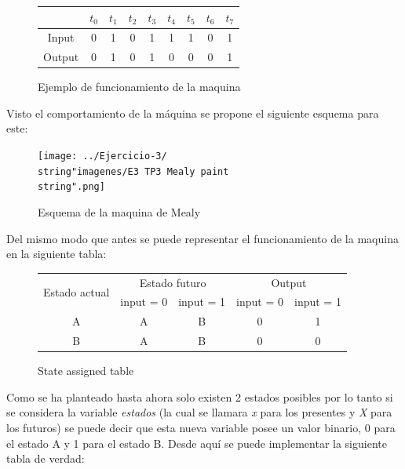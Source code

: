 \begin{figure}[H]
\begin{centering}
\begin{tabular}{|c|c|c|c|c|c|c|c|c|}
\hline 
 & $t_{0}$ & $t_{1}$ & $t_{2}$ & $t_{3}$ & $t_{4}$ & $t_{5}$ & $t_{6}$ & $t_{7}$\tabularnewline
\hline 
\hline 
Input & 0 & 1 & 0 & 1 & 1 & 1 & 0 & 1\tabularnewline
\hline 
Output & 0 & 1 & 0 & 1 & 0 & 0 & 0 & 1\tabularnewline
\hline 
\end{tabular}
\par\end{centering}
\caption{Ejemplo de funcionamiento de la maquina}

\end{figure}

Visto el comportamiento de la máquina se propone el siguiente esquema para este:\\

\begin{figure}[H]
\begin{centering}
\texttt{[image: ../Ejercicio-3/\\string"imagenes/E3 TP3 Mealy paint\\string".png]}
\par\end{centering}
\caption{Esquema de la maquina de Mealy}

\end{figure}

Del mismo modo que antes se puede representar el funcionamiento de la maquina en la siguiente tabla:\\

\begin{figure}[H]
\begin{centering}
\begin{tabular}{|c|c|c|c|c|}
\hline 
\multirow{2}{*}{Estado actual} & \multicolumn{2}{c|}{Estado futuro} & \multicolumn{2}{c|}{Output}\tabularnewline
\cline{2-5} 
 & input = 0 & input = 1 & input = 0 & input = 1\tabularnewline
\hline 
A & A & B & 0 & 1\tabularnewline
\hline 
B & A & B & 0 & 0\tabularnewline
\hline 
\end{tabular}
\par\end{centering}
\caption{State assigned table}

\end{figure}

Como se ha planteado hasta ahora solo existen 2 estados posibles por lo tanto si se considera la variable \emph{estados} (la cual se llamara \emph{x} para los presentes y \emph{X} para los futuros) se puede
decir que esta nueva variable posee un valor binario, 0 para el estado A y 1 para el estado B. Desde aquí se puede implementar la siguiente tabla de verdad:\\

